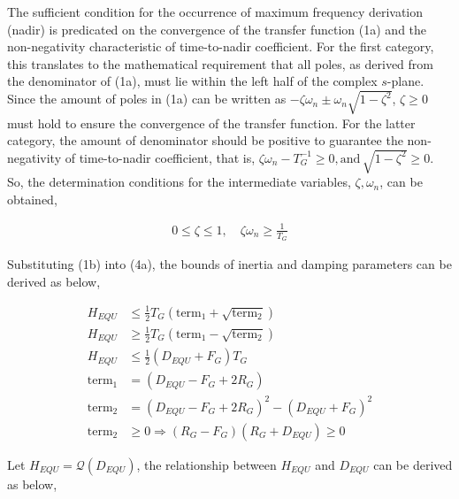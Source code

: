 \documentclass[lettersize,journal]{IEEEtran}
\begin{document}
The sufficient condition for the occurrence of maximum frequency derivation (nadir) is predicated on the convergence of the transfer function (1a) and the non-negativity characteristic of time-to-nadir coefficient. For the first category, this translates to the mathematical requirement that all poles, as derived from the denominator of (1a), must lie within the left half of the complex $s$-plane. Since the amount of poles in (1a) can be written as $-\zeta \omega_n \pm \omega_n \sqrt{1 - \zeta^2}$, $\zeta \geq 0$ must hold to ensure the convergence of the transfer function. For the latter category, the amount of denominator should be positive to guarantee the non-negativity of time-to-nadir coefficient, that is, $\zeta \omega_n - T_G^{-1}\geq 0, \text{and}\, \sqrt{1-\zeta^2} \geq 0$. So, the determination conditions for the intermediate variables, $\zeta, \omega_n$, can be obtained,

\vspace{-0.25cm}
\begin{subequations}
  \begin{align}
    0 \leq \zeta \leq 1, \quad \zeta \omega_n \geq \frac{1}{T_G} \label{eq:zeta_wn}
    \end{align}
  \end{subequations}

Substituting (1b) into (4a), the bounds of inertia and damping parameters can be derived as below,

\vspace{-0.25cm}
\begin{subequations}
  \begin{align}
    H_{EQU} &\leq \frac{1}{2}T_G \left(\text{term}_1 + \sqrt{\text{term}_2} \right) \\
    H_{EQU} &\geq \frac{1}{2}T_G \left(\text{term}_1 - \sqrt{\text{term}_2} \right) \\
    H_{EQU} &\leq \frac{1}{2} (D_{EQU} + F_G) T_{G} \\
    \text{term}_1 &= (D_{EQU} - F_G + 2R_G) \\
    \text{term}_2 &= {(D_{EQU} - F_G + 2R_G)^2 - (D_{EQU} + F_G)^2}\\
    \text{term}_2 &\geq 0 \Longrightarrow (R_G - F_G)(R_G + D_{EQU}) \geq 0
    \end{align}
  \end{subequations}

Let $H_{EQU}=\mathcal{Q} (D_{EQU})$, the relationship between $H_{EQU}$ and $D_{EQU}$ can be derived as below,
\end{document}
